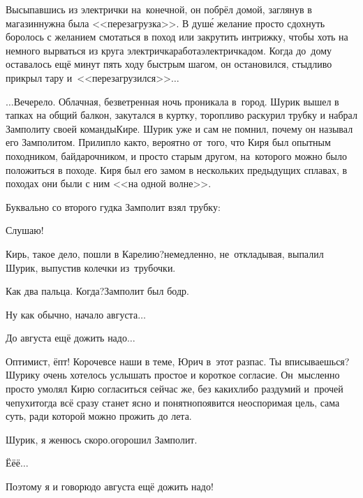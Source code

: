 {	Высыпавшись из электрички на~конечной, он побрёл домой, заглянув в магазин\mdash нужна была <<перезагрузка>>. В душ\'е желание просто сдохнуть боролось с желанием смотаться в поход или закрутить интрижку, чтобы хоть на немного вырваться из круга электричка\sdash работа\sdash электричка\sdash дом. Когда до~дому оставалось ещё минут пять ходу быстрым шагом, он остановился, стыдливо прикрыл тару и~<<перезагрузился>>$\ldots$
	
	
	\vspace{1.9cm}	
	$\ldots$Вечерело. Облачная, безветренная ночь проникала в~город.  Шурик вышел в тапках на общий балкон, закутался в куртку, торопливо раскурил трубку и набрал Замполиту своей команды\mdash Кире. Шурик уже и сам не помнил, почему он называл его Замполитом. Прилипло как\sdash то, вероятно от~того, что Киря был опытным походником, байдарочником, и просто старым другом, на~которого можно было положиться в походе. Киря был его замом в нескольких предыдущих сплавах, в походах они были с ним <<на одной волне>>.

	\newpage	
	Буквально со второго гудка Замполит взял трубку:
	
	\diagdash Слушаю!
	
	\diagdash Кирь, такое дело, пошли в Карелию?\mdash немедленно, не~откладывая, выпалил Шурик, выпустив колечки из~трубочки.
	
	\diagdash Как два пальца. Когда?\mdash Замполит был бодр.
	
	\diagdash Ну как обычно, начало августа$\ldots$
	
	\diagdash До августа ещё дожить надо$\ldots$
	
	\diagdash Оптимист, ёпт! Короче\mdash все наши в теме, Юрич в~этот раз\mdash пас. Ты вписываешься?\mdash Шурику очень хотелось услышать простое и короткое согласие. Он~мысленно просто умолял Кирю согласиться сейчас же, без каких\sdash либо раздумий и~прочей чепухи\mdash тогда всё сразу станет ясно и понятно\mdash появится неоспоримая цель, сама суть, ради которой можно прожить до лета.
	
	\diagdash Шурик, я женюсь скоро.\mdash огорошил Замполит.
	
	\diagdash Ё\sdash ё\sdash ё$\ldots$
	
	\diagdash Поэтому я и говорю\mdash до августа ещё дожить надо!
	
}
